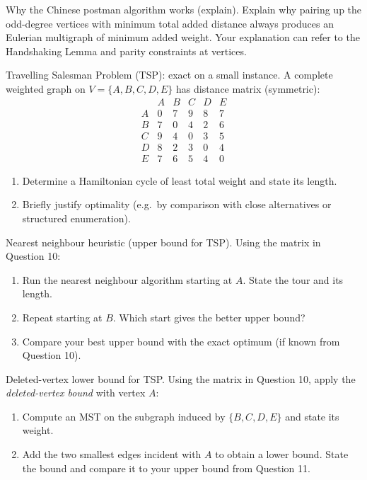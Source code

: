 \documentclass[11pt]{article}
\def\textbf#1{#1}%
\newcounter{question}
\begin{document}
\begin{question}
\textbf{Why the Chinese postman algorithm works (explain).}
Explain why pairing up the odd-degree vertices with minimum total added distance always produces an Eulerian multigraph of minimum added weight. Your explanation can refer to the Handshaking Lemma and parity constraints at vertices.
\end{question}

\begin{question}
\textbf{Travelling Salesman Problem (TSP): exact on a small instance.}
A complete weighted graph on $V=\{A,B,C,D,E\}$ has distance matrix (symmetric):
\[
\begin{array}{c|ccccc}
 & A&B&C&D&E\\\hline
A&0&7&9&8&7\\
B&7&0&4&2&6\\
C&9&4&0&3&5\\
D&8&2&3&0&4\\
E&7&6&5&4&0
\end{array}
\]
\begin{enumerate}
  \item Determine a Hamiltonian cycle of least total weight and state its length.
  \item Briefly justify optimality (e.g.\ by comparison with close alternatives or structured enumeration).
\end{enumerate}
\end{question}

\begin{question}
\textbf{Nearest neighbour heuristic (upper bound for TSP).}
Using the matrix in Question 10:
\begin{enumerate}
  \item Run the nearest neighbour algorithm starting at $A$. State the tour and its length.
  \item Repeat starting at $B$. Which start gives the better upper bound?
  \item Compare your best upper bound with the exact optimum (if known from Question 10).
\end{enumerate}
\end{question}

\begin{question}
\textbf{Deleted-vertex lower bound for TSP.}
Using the matrix in Question 10, apply the \emph{deleted-vertex bound} with vertex $A$:
\begin{enumerate}
  \item Compute an MST on the subgraph induced by $\{B,C,D,E\}$ and state its weight.
  \item Add the two smallest edges incident with $A$ to obtain a lower bound. State the bound and compare it to your upper bound from Question 11.
\end{enumerate}
\end{question}
\end{document}
